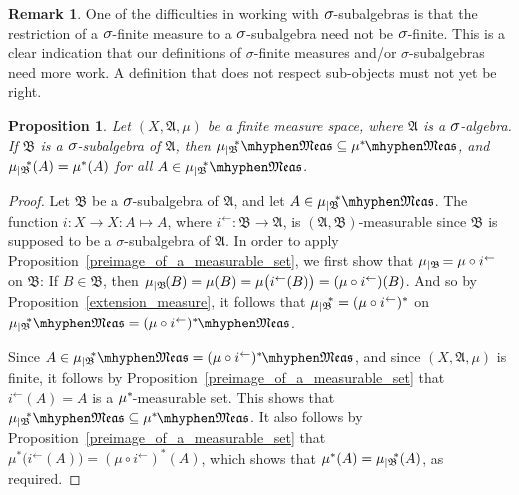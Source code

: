 \documentclass[
twoside=true,
paper=letter,
fontsize=11pt,
pagesize=auto,
leqno,
openany,
headsepline,
overfullrule,
]{scrbook}
\theoremstyle{plain}
\theoremstyle{plain}
\newtheorem{prop}[thm]{Proposition}
\theoremstyle{definition}
\newtheorem{rmk}[thm]{Remark}
\theoremstyle{bfnoteitalic}
\theoremstyle{bfnoteroman}
\newcommand{\sigalg}[1]{\mathfrak{#1}}
\newcommand{\textsigma}{\hbox{\large{$\sigma$}}\kern-1pt}
\newcommand{\restrictedto}[1]{_{\lvert#1}\kern-1.5pt}
\newcommand{\preimage}[1]{#1^{\leftarrow}}
\newcommand{\sigmaalgebra}{\sigalg{A}}
\newcommand{\sigmaalgebraii}{\sigalg{B}}
\newcommand{\measurable}[1]{{#1}\mhyphen\mathfrak{Meas}}
\newcommand{\kernast}{\ast\kern-1pt}
\newcommand{\measuresubstar}[1]{\measure\restrictedto{#1}\kern-2pt^*}
\newcommand{\measurespace}{X}
\newcommand{\measure}{\mu}
\begin{document}
\begin{rmk}
One of the difficulties in working with $\textsigma$\hyp{}subalgebras is that
the restriction of a $\textsigma$\hyp{}finite measure to a $\textsigma$\hyp{}subalgebra need not be 
$\textsigma$\hyp{}finite.  This is a clear indication that our definitions of \textsigma\hyp{}finite measures and/or \textsigma\hyp{}subalgebras need more work. A definition that does not respect sub\hyp{}objects must not yet be right.
\end{rmk}





\begin{prop}\label{measurable_inclusion}
Let $(\measurespace, \sigmaalgebra, \measure)$ be a finite measure space, where $\sigmaalgebra$ is a $\textsigma$-algebra.  If $\sigmaalgebraii$ is a $\textsigma$-subalgebra of $\sigmaalgebra$, then 
$\measurable{\measuresubstar{\sigmaalgebraii}} \subseteq \measurable{\measure^\kernast}$, and
$\measuresubstar{\sigmaalgebraii}(A) = \measure^*(A)$ for all 
$A \in \measurable{\measuresubstar{\sigmaalgebraii}}$.
\end{prop}



\begin{proof}
Let $\sigmaalgebraii$ be a $\textsigma$-subalgebra of $\sigmaalgebra$, and let 
$A\in \measurable{\measuresubstar{\sigmaalgebraii}}$.
The function $i:\measurespace\to\measurespace : A \mapsto A$, where $\preimage{i}:\sigmaalgebraii\to\sigmaalgebra$, is $(\sigmaalgebra, \sigmaalgebraii)$\hyp{}measurable since $\sigmaalgebraii$ is supposed to be a \textsigma-subalgebra of $\sigmaalgebra$.
In order to apply Proposition~\ref{preimage_of_a_measurable_set}, we first show that $\measure\restrictedto{\sigmaalgebraii} = \measure\circ\preimage{i}$ on $\sigmaalgebraii$: If $B\in\sigmaalgebraii$, then 
$\measure\restrictedto{\sigmaalgebraii}(B) 
= \measure(B) 
= \measure\bigl(\preimage{i}(B)\bigr)
= (\measure\circ\preimage{i})(B)$.
And so by Proposition~\ref{extension_measure}, it follows that $\measuresubstar{\sigmaalgebraii}=(\measure\circ\preimage{i})^*$ on 
$\measurable{\measuresubstar{\sigmaalgebraii}} 
= 
\measurable{(\measure\circ\preimage{i})^\kernast}$.


Since $A\in \measurable{\measuresubstar{\sigmaalgebraii}} =\measurable{(\measure\circ\preimage{i})^\kernast}$,
and since $(\measurespace, \sigmaalgebra, \measure)$ is finite,
it follows by Proposition~\ref{preimage_of_a_measurable_set} that 
$\preimage{i}(A) = A$ is a $\measure^\kernast$-measurable set.  This shows that 
$\measurable{\measuresubstar{\sigmaalgebraii}} \subseteq \measurable{\measure^\kernast}$. 
It also follows by Proposition~\ref{preimage_of_a_measurable_set} that 
$\measure^*\bigl(\preimage{i}(A)\bigr) = (\measure\circ\preimage{i})^*(A)$, which shows that $\measure^*(A) = \measuresubstar{\sigmaalgebraii}(A)$, as required.
\end{proof}
\end{document}
